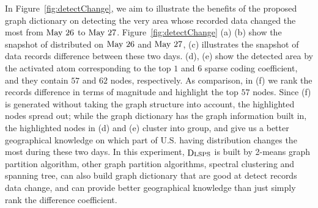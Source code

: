 \documentclass[journal,twocolumn,10pt]{IEEEtran}
\theoremstyle{definition}
\DeclareMathOperator{\D}{D}
\begin{document}
In Figure~\ref{fig:detectChange}, we aim to illustrate the benefits of the proposed graph dictionary on detecting the very area whose recorded data changed the most from ${\rm May\ 26}$ to ${\rm May\ 27}$. Figure~\ref{fig:detectChange} (a) (b) show the snapshot of  distributed on ${\rm May\ 26}$ and ${\rm May\ 27}$, (c) illustrates the snapshot of data records difference between these two days. (d), (e) show the detected area by the activated atom corresponding to the top $1$ and $6$ sparse coding coefficient, and they contain $57$ and $62$ nodes, respectively. As comparison, in (f) we rank the records difference in terms of magnitude and highlight the top $57$ nodes. Since (f) is generated without taking the graph structure into account, the highlighted nodes spread out; while the graph dictionary has the graph information built in, the highlighted nodes in (d) and (e) cluster into group, and give us a better geographical knowledge on which part of U.S. having  distribution changes the most during these two days. In this experiment, $ \D_{\rm LSPS}$ is built by 2-means graph partition algorithm, other graph partition algorithms, spectral clustering and spanning tree, can also build graph dictionary that are good at detect records data change, and can provide better geographical knowledge than just simply rank the difference coefficient.
\end{document}
